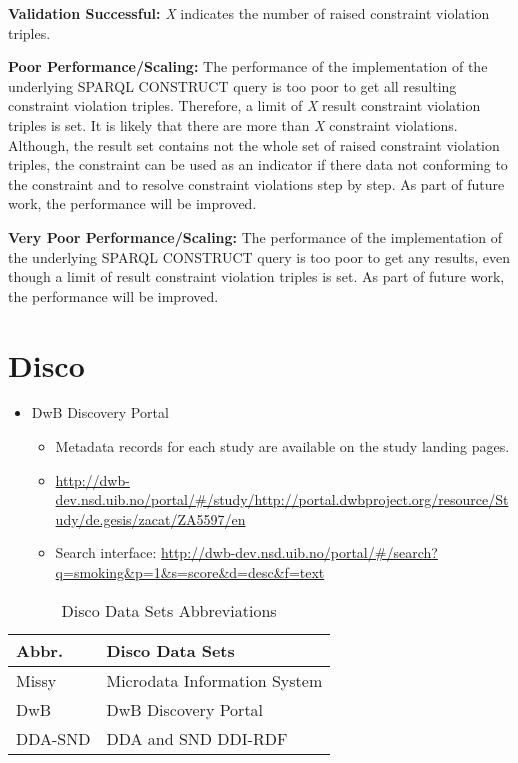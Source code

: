 \documentclass{llncs}
\begin{document}
\textbf{Validation Successful:} 
\emph{X} indicates the number of raised constraint violation triples. 

\textbf{Poor Performance/Scaling:}
The performance of the implementation of the underlying SPARQL CONSTRUCT query 
is too poor to get all resulting constraint violation triples. 
Therefore, a limit of \emph{X} result constraint violation triples is set. 
It is likely that there are more than \emph{X} constraint violations.
Although, the result set contains not the whole set of raised constraint violation triples,
the constraint can be used as an indicator if there data not conforming to the constraint and
to resolve constraint violations step by step. 
As part of future work, the performance will be improved.

\textbf{Very Poor Performance/Scaling:} 
The performance of the implementation of the underlying SPARQL CONSTRUCT query 
is too poor to get any results, even though a limit of result constraint violation triples is set. 
As part of future work, the performance will be improved. 

\section{Disco}

\begin{itemize}
	\item DwB Discovery Portal
	\begin{itemize}
	  \item Metadata records for each study are available on the study landing pages.
		\item \url{http://dwb-dev.nsd.uib.no/portal/#/study/http://portal.dwbproject.org/resource/Study/de.gesis/zacat/ZA5597/en}
    \item Search interface: \url{http://dwb-dev.nsd.uib.no/portal/#/search?q=smoking&p=1&s=score&d=desc&f=text}
	\end{itemize}
\end{itemize}

\begin{table}[H]
	\centering
		\begin{tabular}{l|l}
      \textbf{Abbr.} & \textbf{Disco Data Sets} \\		
      \hline
    Missy & Microdata Information System\tablefootnote{\url{http://www.gesis.org/missy/eu/missy-home}} \\
		DwB & DwB Discovery Portal\tablefootnote{\url{http://dwb-dev.nsd.uib.no/portal}} \\
		DDA-SND & DDA and SND DDI-RDF\tablefootnote{\url{http://ddi-rdf.borsna.se/}} \\ 
		\end{tabular}
	\caption{Disco Data Sets Abbreviations}
	\label{tab:disco-data-sets-abbreviations}
\end{table}
\end{document}
